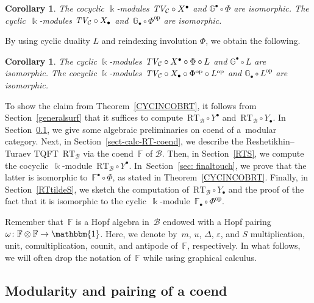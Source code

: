 \documentclass[pdftex]{sigma}
\numberwithin{equation}{section}
\newtheorem{Corollary}[Theorem]{Corollary}
\newcommand{\co}{\colon}
\newcommand{\mc}{\mathcal}
\newcommand{\opp}{\mathrm{op}}
\newcommand{\kk}{\Bbbk}
\newcommand{\uu}{\mathbbm{1}}
\newcommand{\RT}{\text{RT}}
\newcommand{\TV}{\text{TV}}
\newcommand{\coend}{\mathbb{F}}
\newcommand{\coendzc}{\mathbb{G}}
\begin{document}
\begin{Corollary}%
	The cocyclic $\kk$-modules $\emph{\TV}_{\mc C} \circ X^\bullet$ and $\coendzc^\bullet \circ \Phi$ are isomorphic. The cyclic~$\kk$-modules $\emph{\TV}_{\mc C} \circ X_\bullet$ and~$\coendzc_\bullet \circ \Phi^{\opp}$ are isomorphic.
\end{Corollary}
By using cyclic duality $L$ and reindexing involution $\Phi$, we obtain the following.

\begin{Corollary}
	The cyclic $\kk$-modules $\emph{\TV}_{\mc C} \circ X^\bullet \circ \Phi \circ L$ and $\coendzc^\bullet \circ L$ are isomorphic. The cocyclic $\kk$-modules $\emph{\TV}_{\mc C} \circ X_\bullet \circ \Phi^{\opp} \circ L^\opp$ and $\coendzc_\bullet \circ L^\opp$ are isomorphic.
\end{Corollary}

To show the claim from Theorem~\ref{CYCINCOBRT}, it follows from Section~\ref{generalsurf} that it suffices to compute~$\RT_\mc B\circ Y^\bullet$ and~$\RT_\mc B\circ Y_\bullet$. In Section~\ref{sect-modul-coend}, we give some algebraic preliminaries on coend of a~modular category. Next, in Section~\ref{sect-calc-RT-coend}, we describe the Reshetikhin--Turaev TQFT~$\RT_{\mc B}$ via the coend~$\coend$ of $\mc B$. Then, in Section~\ref{RTS}, we compute the cocyclic~$\kk$-module~$\RT_{\mc B}\circ Y^\bullet$.
In~Section~\ref{sec: finaltouch}, we prove that the latter is isomorphic to~$\coend^\bullet \circ \Phi$, as stated in Theorem~\ref{CYCINCOBRT}.
Finally, in Section~\ref{RTtildeS}, we sketch the computation of~$\RT_{\mc B}\circ Y_\bullet$ and the proof of the fact that it is isomorphic to the cyclic~$\kk$-module~$\coend_\bullet \circ \Phi^{\opp}$.

Remember that~$\coend$ is a Hopf algebra in~$\mc B$ endowed with a Hopf pairing~$\omega \co \coend \otimes \coend \to \uu$.
Here, we denote by~$m$, $u$, $\Delta$, $\varepsilon$, and $S$ multiplication, unit, comultiplication, counit, and antipode of~$\coend$, respectively. In what follows, we will often drop the notation of~$\coend$ while using graphical calculus.

\subsection{Modularity and pairing of a coend}\label{sect-modul-coend}
\end{document}
